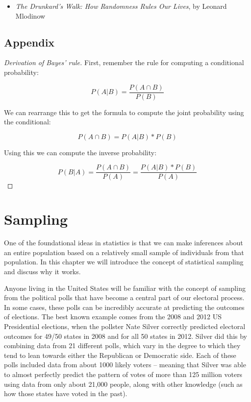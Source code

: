 \documentclass[12pt,]{book}
\providecommand{\tightlist}{%
  \setlength{\itemsep}{0pt}\setlength{\parskip}{0pt}}
\theoremstyle{definition}
\theoremstyle{definition}
\theoremstyle{definition}
\theoremstyle{remark}
\let\BeginKnitrBlock\begin \let\EndKnitrBlock\end
\begin{document}
\begin{itemize}
\tightlist
\item
  \emph{The Drunkard's Walk: How Randomness Rules Our Lives}, by Leonard Mlodinow
\end{itemize}

\hypertarget{appendix-2}{%
\section{Appendix}\label{appendix-2}}

\BeginKnitrBlock{proof}[Derivation of Bayes' rule]
{}
First, remember the rule for computing a conditional probability:

\[
P(A|B) = \frac{P(A \cap B)}{P(B)}
\]

We can rearrange this to get the formula to compute the joint probability using the conditional:

\[
P(A \cap B) = P(A|B) * P(B)
\]

Using this we can compute the inverse probability:

\[
P(B|A) = \frac{P(A \cap B)}{P(A)} =   \frac{P(A|B)*P(B)}{P(A)}
\]
\EndKnitrBlock{proof}

\hypertarget{sampling}{%
\chapter{Sampling}\label{sampling}}

One of the foundational ideas in statistics is that we can make inferences about an entire population based on a relatively small sample of individuals from that population. In this chapter we will introduce the concept of statistical sampling and discuss why it works.

Anyone living in the United States will be familiar with the concept of sampling from the political polls that have become a central part of our electoral process. In some cases, these polls can be incredibly accurate at predicting the outcomes of elections. The best known example comes from the 2008 and 2012 US Presidential elections, when the pollster Nate Silver correctly predicted electoral outcomes for 49/50 states in 2008 and for all 50 states in 2012. Silver did this by combining data from 21 different polls, which vary in the degree to which they tend to lean towards either the Republican or Democratic side. Each of these polls included data from about 1000 likely voters -- meaning that Silver was able to almost perfectly predict the pattern of votes of more than 125 million voters using data from only about 21,000 people, along with other knowledge (such as how those states have voted in the past).
\end{document}
